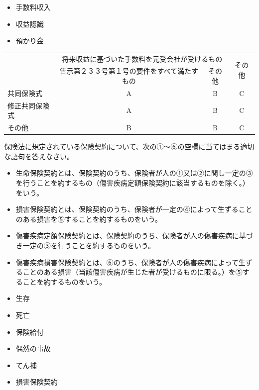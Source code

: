 \documentclass[report,gutter=10mm,fore-edge=10mm,uplatex,dvipdfmx]{jlreq}
\begin{document}
\begin{itemize}
\item[ ①: ] 手数料収入
\item[ ②: ] 収益認識
\item[ ③: ] 預かり金
\end{itemize}

\begin{tabular}{|l|c|c|c|}
 \hline
\multirow{2}{*}{}& \multicolumn{2}{c|}{将来収益に基づいた手数料を元受会社が受けるもの}
 &\multirow{2}{*}{その他}\\  \cline{2-3}
&告示第２３３号第１号の要件をすべて満たすもの&その他&\\ \hline
共同保険式  & A&B &C \\ \hline
修正共同保険式 &A &B & C \\ \hline
その他 & B & B & C\\ \hline
\end{tabular}

保険法に規定されている保険契約について、次の①～⑥の空欄に当てはまる適切な語句を答えなさい。

\begin{itemize}
\item[ ・ ] 生命保険契約とは、保険契約のうち、保険者が人の①又は②に関し一定の③を行うことを約するもの（傷害疾病定額保険契約に該当するものを除く。）をいう。
\item[ ・ ] 損害保険契約とは、保険契約のうち、保険者が一定の④によって生ずることのある損害を⑤することを約するものをいう。
\item[ ・ ] 傷害疾病定額保険契約とは、保険契約のうち、保険者が人の傷害疾病に基づき一定の③を行うことを約するものをいう。
\item[ ・ ] 傷害疾病損害保険契約とは、⑥のうち、保険者が人の傷害疾病によって生ずることのある損害（当該傷害疾病が生じた者が受けるものに限る。）を⑤することを約するものをいう。
\end{itemize}

\answer{}
\begin{itemize}
\item[ ① ]  生存
\item[ ② ]  死亡
\item[ ③ ]  保険給付
\item[ ④ ]  偶然の事故
\item[ ⑤ ]  てん補
\item[ ⑥ ]  損害保険契約
\end{itemize}
\end{document}
